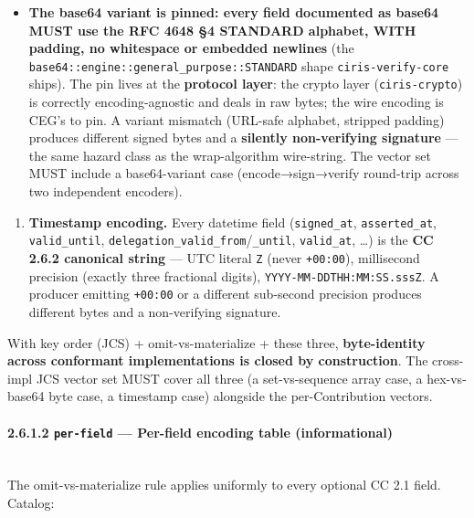 \documentclass[11pt]{article}
\begin{document}
\begin{itemize}\setlength\itemsep{0pt}
\item \textbf{The base64 variant is pinned: every field documented as base64 MUST use the RFC 4648 §4 STANDARD alphabet, WITH padding, no whitespace or embedded newlines} (the \texttt{base64::engine::general\_purpose::STANDARD} shape \texttt{ciris-verify-core} ships). The pin lives at the \textbf{protocol layer}: the crypto layer (\texttt{ciris-crypto}) is correctly encoding-agnostic and deals in raw bytes; the wire encoding is CEG's to pin. A variant mismatch (URL-safe alphabet, stripped padding) produces different signed bytes and a \textbf{silently non-verifying signature} — the same hazard class as the wrap-algorithm wire-string. The vector set MUST include a base64-variant case (encode→sign→verify round-trip across two independent encoders).
\end{itemize}

\begin{enumerate}\setlength\itemsep{0pt}
\item \textbf{Timestamp encoding.} Every datetime field (\texttt{signed\_at}, \texttt{asserted\_at}, \texttt{valid\_until}, \texttt{delegation\_valid\_from}/\texttt{\_until}, \texttt{valid\_at}, …) is the \textbf{CC 2.6.2 canonical string} — UTC literal \texttt{Z} (never \texttt{+00:00}), millisecond precision (exactly three fractional digits), \texttt{YYYY-MM-DDTHH:MM:SS.sssZ}. A producer emitting \texttt{+00:00} or a different sub-second precision produces different bytes and a non-verifying signature.
\end{enumerate}


With key order (JCS) + omit-vs-materialize + these three, \textbf{byte-identity across conformant implementations is closed by construction}. The cross-impl JCS vector set MUST cover all three (a set-vs-sequence array case, a hex-vs-base64 byte case, a timestamp case) alongside the per-Contribution vectors.


\paragraph{2.6.1.2 \texttt{per-field} — Per-field encoding table (informational)}\mbox{}\\


The omit-vs-materialize rule applies uniformly to every optional CC 2.1 field. Catalog:
\end{document}
